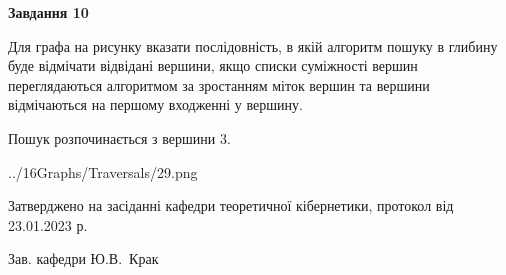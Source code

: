 \documentclass[12pt, ukrainian]{article}
\begin{document}
{\begin {large}
{\begin {center}\textbf{Завдання 10}\end {center}}\par
Для графа на рисунку вказати послідовність, в якій алгоритм пошуку в глибину буде відмічати відвідані вершини, якщо списки суміжності вершин переглядаються алгоритмом за зростанням міток вершин та вершини відмічаються на першому вход\-женні у вершину.\par
Пошук розпочинається з вершини 3.\par

\begin{center}
	{../16Graphs/Traversals/29.png}
\end{center}\par
\newpage


\end {large}
}
{\smallskip \begin {small} Затверджено на засіданні кафедри теоретичної кібернетики, протокол  від   23.01.2023 р.\par\smallskip\smallskip
{\parbox {6.5 cm}{Зав. кафедри \dotfill Ю.В.~Крак}} \end{small}}
\end{document}
